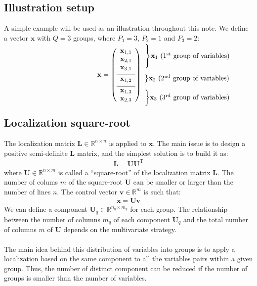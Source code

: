 \documentclass[12pt]{scrartcl}
\begin{document}
\subsection{Illustration setup}
A simple example will be used as an illustration throughout this note. We define a vector $\mathbf{x}$ with $Q = 3$ groups, where $P_1 = 3$, $P_2 = 1$ and $P_3 = 2$:
\begin{align}
\begin{array}{c@{}c}
\mathbf{x} = \left( \begin{array}{c}
\mathbf{x}_{1,1} \\
\mathbf{x}_{2,1} \\
\mathbf{x}_{3,1} \\[1ex]
\hline
\mathbf{x}_{1,2} \\[1ex]
\hline
\mathbf{x}_{1,3} \\
\mathbf{x}_{2,3}
\end{array} \right)
& 
\begin{array}{l}
\\[-8.5mm] \rdelim\}{3}{6mm}[$\mathbf{x}_1$ (1$^\text{st}$ group of variables)] \\[11.5mm] \rdelim\}{1}{6mm}[$\mathbf{x}_2$ (2$^\text{nd}$ group of variables)] \\[3.5mm] \rdelim\}{2}{6mm}[$\mathbf{x}_3$ (3$^\text{rd}$ group of variables)]
\end{array} \\[-1ex]
\end{array}
\end{align}

\subsection{Localization square-root}
The localization matrix $\mathbf{L} \in \mathbb{R}^{n \times n}$ is applied to $\mathbf{x}$. The main issue is to design a positive semi-definite $\mathbf{L}$ matrix, and the simplest solution is to build it as:
\begin{align}
\mathbf{L} = \mathbf{UU}^\textrm{T}
\end{align}
where $\mathbf{U} \in \mathbb{R}^{n \times m}$ is called a ``square-root'' of the localization matrix $\mathbf{L}$. The number of colums $m$ of the square-root $\mathbf{U}$ can be smaller or larger than the number of lines $n$. The control vector $\mathbf{v} \in \mathbb{R}^m$ is such that:
\begin{align}
\mathbf{x} = \mathbf{U} \mathbf{v}
\end{align}
We can define a component $\mathbf{U}_q \in \mathbb{R}^{n_q \times m_q}$ for each group. The relationship between the number of columns $m_q$ of each component $\mathbf{U}_q$ and the total number of columns $m$ of $\mathbf{U}$ depends on the multivariate strategy.\\
$  $\\
The main idea behind this distribution of variables into groups is to apply a localization based on the same component to all the variables pairs within a given group. Thus, the number of distinct component can be reduced if the number of groups is smaller than the number of variables.
\end{document}
